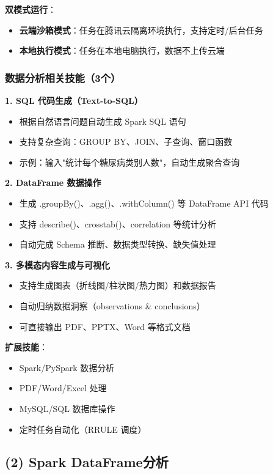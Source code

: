 \documentclass[12pt,a4paper]{article}
\begin{document}
\textbf{双模式运行}：
\begin{itemize}
    \item \textbf{云端沙箱模式}：任务在腾讯云隔离环境执行，支持定时/后台任务
    \item \textbf{本地执行模式}：任务在本地电脑执行，数据不上传云端
\end{itemize}

\subsubsection{数据分析相关技能（3个）}

\textbf{1. SQL 代码生成（Text-to-SQL）}
\begin{itemize}
    \item 根据自然语言问题自动生成 Spark SQL 语句
    \item 支持复杂查询：GROUP BY、JOIN、子查询、窗口函数
    \item 示例：输入"统计每个糖尿病类别人数"，自动生成聚合查询
\end{itemize}

\textbf{2. DataFrame 数据操作}
\begin{itemize}
    \item 生成 .groupBy()、.agg()、.withColumn() 等 DataFrame API 代码
    \item 支持 describe()、crosstab()、correlation 等统计分析
    \item 自动完成 Schema 推断、数据类型转换、缺失值处理
\end{itemize}

\textbf{3. 多模态内容生成与可视化}
\begin{itemize}
    \item 支持生成图表（折线图/柱状图/热力图）和数据报告
    \item 自动归纳数据洞察（observations \& conclusions）
    \item 可直接输出 PDF、PPTX、Word 等格式文档
\end{itemize}

\textbf{扩展技能}：
\begin{itemize}
    \item Spark/PySpark 数据分析
    \item PDF/Word/Excel 处理
    \item MySQL/SQL 数据库操作
    \item 定时任务自动化（RRULE 调度）
\end{itemize}

\subsection{(2) Spark DataFrame分析}
\end{document}
